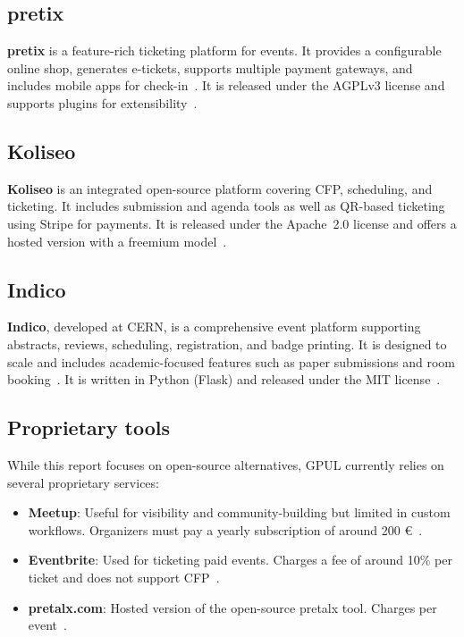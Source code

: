 \subsection{pretix}
\textbf{pretix} is a feature-rich ticketing platform for events. It provides a configurable online shop, generates e-tickets, supports multiple payment gateways, and includes mobile apps for check-in~\cite{pretix-docs}. It is released under the AGPLv3 license and supports plugins for extensibility~\cite{pretix-license-faq}.

\subsection{Koliseo}
\textbf{Koliseo} is an integrated open-source platform covering CFP, scheduling, and ticketing. It includes submission and agenda tools as well as QR-based ticketing using Stripe for payments. It is released under the Apache~2.0 license and offers a hosted version with a freemium model~\cite{koliseo-website}.

\subsection{Indico}
\textbf{Indico}, developed at CERN, is a comprehensive event platform supporting abstracts, reviews, scheduling, registration, and badge printing. It is designed to scale and includes academic-focused features such as paper submissions and room booking~\cite{indico-github}. It is written in Python (Flask) and released under the MIT license~\cite{indico-faq}.

\subsection{Proprietary tools}
While this report focuses on open-source alternatives, GPUL currently relies on several proprietary services:

\begin{itemize}
  \item \textbf{Meetup}: Useful for visibility and community-building but limited in custom workflows. Organizers must pay a yearly subscription of around 200 €~\cite{meetup-wiki}.
  \item \textbf{Eventbrite}: Used for ticketing paid events. Charges a fee of around 10\% per ticket and does not support CFP~\cite{eventbrite-wiki}.
  \item \textbf{pretalx.com}: Hosted version of the open-source pretalx tool. Charges per event~\cite{pretalx-pricing}.
\end{itemize}

